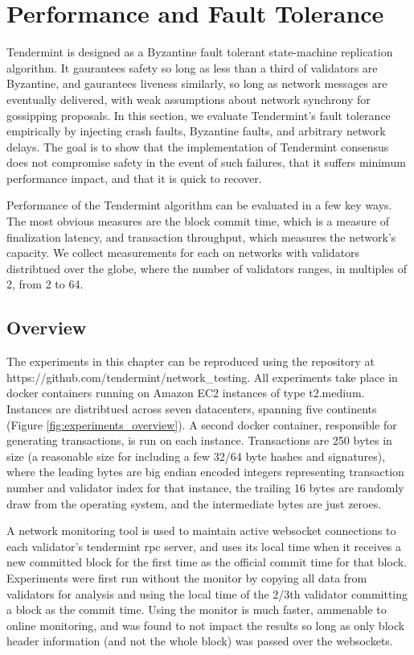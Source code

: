 \chapter{Performance and Fault Tolerance}
\label{ch:performance}

Tendermint is designed as a Byzantine fault tolerant state-machine replication algorithm.
It gaurantees safety so long as less than a third of validators are Byzantine, 
and gaurantees liveness similarly, so long as network messages are eventually delivered,
with weak assumptions about network synchrony for gossipping proposals.
In this section, we evaluate Tendermint's fault tolerance empirically by injecting 
crash faults, Byzantine faults, and arbitrary network delays.
The goal is to show that the implementation of Tendermint consensus does not compromise safety in the event of such failures,
that it suffers minimum performance impact, and that it is quick to recover.

Performance of the Tendermint algorithm can be evaluated in a few key ways.
The most obvious measures are the block commit time, which is a measure of finalization latency, 
and transaction throughput, which measures the network's capacity.
We collect measurements for each on networks with validators distribtued over the globe, 
where the number of validators ranges, in multiples of 2, from 2 to 64.

\section{Overview}

The experiments in this chapter can be reproduced using the repository at https://github.com/tendermint/network\_testing.
All experiments take place in docker containers running on Amazon EC2 instances of type t2.medium.
Instances are distribtued across seven datacenters, spanning five continents (Figure \ref{fig:experiments_overview}).
A second docker container, responsible for generating transactions, is run on each instance.
Transactions are 250 bytes in size (a reasonable size for including a few 32/64 byte hashes and signatures),
where the leading bytes are big endian encoded integers representing transaction number and validator index for that instance,
the trailing 16 bytes are randomly draw from the operating system, and the intermediate bytes are just zeroes.

A network monitoring tool is used to maintain active websocket connections to each validator's tendermint rpc server,
and uses its local time when it receives a new committed block for the first time as the official commit time for that block.
Experiments were first run without the monitor by copying all data from validators for analysis and using the local time
of the 2/3th validator committing a block as the commit time. 
Using the monitor is much faster, ammenable to online monitoring, and was found to not impact the results 
so long as only block header information (and not the whole block) was passed over the websockets.

